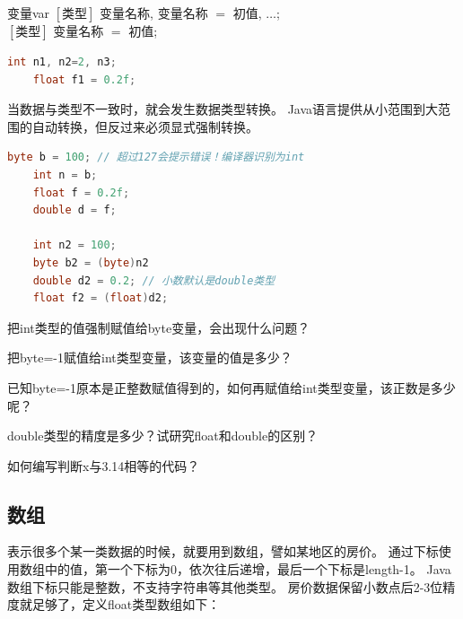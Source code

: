 \begin{definition}{变量}{var}
	$[\text{类型}]$ 变量名称, 变量名称 $=$ 初值, $\dots$;\\
	$[\text{类型}]$ 变量名称 $=$ 初值;
\end{definition}

\begin{lstlisting}[language=java]
	int n1, n2=2, n3;
	float f1 = 0.2f;
\end{lstlisting}


\bigskip
当数据与类型不一致时，就会发生数据类型转换。
Java语言提供从小范围到大范围的自动转换，但反过来必须显式强制转换。

\begin{lstlisting}[language=java]
	byte b = 100; // 超过127会提示错误！编译器识别为int
	int n = b;
	float f = 0.2f;
	double d = f;

	int n2 = 100;
	byte b2 = (byte)n2
	double d2 = 0.2; // 小数默认是double类型
	float f2 = (float)d2;
\end{lstlisting}

\bigskip

\begin{exercise}
	把int类型的值强制赋值给byte变量，会出现什么问题？
\end{exercise}

\begin{exercise}
	把byte=-1赋值给int类型变量，该变量的值是多少？
\end{exercise}

\begin{exercise}
	已知byte=-1原本是正整数赋值得到的，如何再赋值给int类型变量，该正数是多少呢？
\end{exercise}

\begin{exercise}
	double类型的精度是多少？试研究float和double的区别？
\end{exercise}

\begin{exercise}
	如何编写判断x与3.14相等的代码？
\end{exercise}

\subsection{数组}
表示很多个某一类数据的时候，就要用到数组，譬如某地区的房价。
通过下标使用数组中的值，第一个下标为0，依次往后递增，最后一个下标是length-1。
Java数组下标只能是整数，不支持字符串等其他类型。
房价数据保留小数点后2-3位精度就足够了，定义float类型数组如下：

